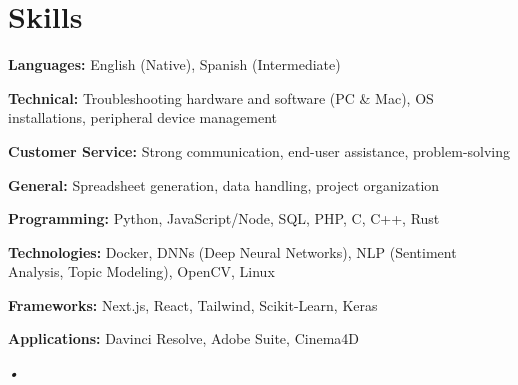 \documentclass[letterpaper,11pt]{article}
\makeatletter
\newcommand{\resumeOrganizationHeading}[4]{
	\vspace{-2pt}\item
	\begin{tabular*}{0.97\textwidth}[t]{l@{\extracolsep{\fill}}r}
		\textbf{#1} & \textit{\small #2} \\
		\textit{\small#3}
	\end{tabular*}\vspace{-7pt}
}
\newcommand{\resumeSubHeadingListStart}{\begin{itemize}[leftmargin=0.15in, label={}]}
\newcommand{\resumeSubHeadingListEnd}{\end{itemize}}
\makeatother
\begin{document}
\section{Skills}
\vspace{2pt}
\resumeSubHeadingListStart
\small{\item{
\textbf{Languages:} English (Native), Spanish (Intermediate) \\ \vspace{2pt}

\textbf{Technical:} Troubleshooting hardware and software (PC \& Mac), OS installations, peripheral device management \\ \vspace{2pt}

\textbf{Customer Service:} Strong communication, end-user assistance, problem-solving \\ \vspace{2pt}

\textbf{General:} Spreadsheet generation, data handling, project organization \\ \vspace{2pt}

\textbf{Programming:} Python, JavaScript/Node, SQL, PHP, C, C++, Rust \\ \vspace{2pt}

\textbf{Technologies:} Docker, DNNs (Deep Neural Networks), NLP (Sentiment Analysis, Topic Modeling), OpenCV, Linux \\ \vspace{2pt}

\textbf{Frameworks:} Next.js, React, Tailwind, Scikit-Learn, Keras \\ \vspace{2pt}

\textbf{Applications:} Davinci Resolve, Adobe Suite, Cinema4D \vspace{2pt}
}}
\resumeSubHeadingListEnd\textit{•}




\end{document}
